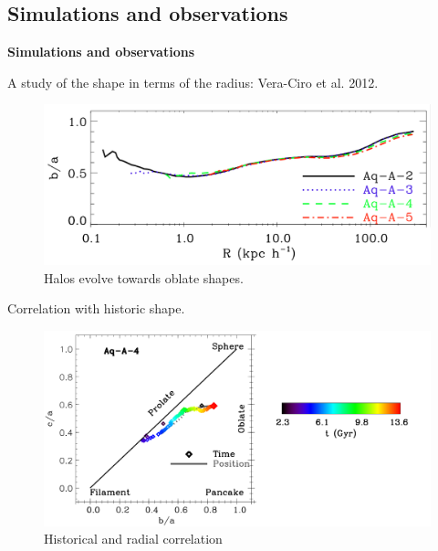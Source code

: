 \documentclass[xcolor=dvipsnames]{beamer}
\begin{document}
\subsection{Simulations and observations}
\begin{frame}
\centering
\LARGE
\textbf{Simulations and observations}
\normalsize
\end{frame}

\begin{frame}
\centering
A study of the shape in terms of the radius: Vera-Ciro et al. 2012.

\begin{figure}[c]
\includegraphics[width=1\linewidth]{./pics/shapeRadius.png}
\caption{ Halos evolve towards oblate shapes.}
\end{figure}

\end{frame}


\begin{frame}
\centering
Correlation with historic shape.

\begin{figure}
\includegraphics[width=1\linewidth]{./pics/shapeHistory.png}
\caption{\tiny Historical and radial correlation}
\end{figure}

\end{frame}
\end{document}
